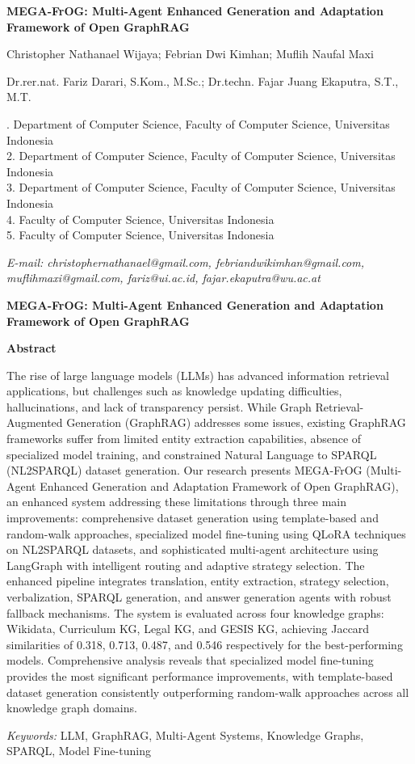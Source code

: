 \documentclass[12pt,a4paper,onecolumn]{article}
\makeatletter
\def\judul{MEGA-FrOG: Multi-Agent Enhanced Generation and Adaptation Framework of Open GraphRAG}
\def\judulInggris{MEGA-FrOG: Multi-Agent Enhanced Generation and Adaptation Framework of Open GraphRAG}
\def\penulisMahasiswa{Christopher Nathanael Wijaya; Febrian Dwi Kimhan; Muflih Naufal Maxi}
\def\penulisPembimbing{Dr.rer.nat. Fariz Darari, S.Kom., M.Sc.; Dr.techn. Fajar Juang Ekaputra, S.T., M.T.}
\def\afiliasiSatu{Department of Computer Science, Faculty of Computer Science, Universitas Indonesia}
\def\afiliasiDua{Department of Computer Science, Faculty of Computer Science, Universitas Indonesia}
\def\afiliasiTiga{Department of Computer Science, Faculty of Computer Science, Universitas Indonesia}
\def\afiliasiEmpat{Faculty of Computer Science, Universitas Indonesia}
\def\afiliasiLima{Faculty of Computer Science, Universitas Indonesia}
\def\emailSatu{christophernathanael@gmail.com, febriandwikimhan@gmail.com, muflihmaxi@gmail.com, fariz@ui.ac.id, fajar.ekaputra@wu.ac.at}
\renewcommand\maketitle{%
  \begin{center}
    {\fontsize{14}{17}\selectfont\bfseries \judul\par\vspace{12pt}}
    {\normalsize \penulisMahasiswa\par}
    {\normalsize \penulisPembimbing\par\vspace{12pt}}
    {\fontsize{10}{12}\selectfont
      1. \afiliasiSatu\\
      2. \afiliasiDua\\
      3. \afiliasiTiga\\
      4. \afiliasiEmpat\\
      5. \afiliasiLima\par}
    \vspace{12pt}
    {\fontsize{10}{12}\selectfont\itshape E-mail: \emailSatu\par}
  \end{center}
}
\makeatother
\begin{document}
\maketitle

\vspace*{2\baselineskip}
{\begin{center}\textbf{\fontsize{12}{14}\selectfont \judulInggris}\end{center}}
\vspace{12pt}
{\begin{center}\textbf{\fontsize{12}{14}\selectfont Abstract}\end{center}}
\vspace{12pt}
{\fontsize{10}{12}\selectfont\singlespacing
The rise of large language models (LLMs) has advanced information retrieval applications, but challenges such as knowledge updating difficulties, hallucinations, and lack of transparency persist. While Graph Retrieval-Augmented Generation (GraphRAG) addresses some issues, existing GraphRAG frameworks suffer from limited entity extraction capabilities, absence of specialized model training, and constrained Natural Language to SPARQL (NL2SPARQL) dataset generation. Our research presents MEGA-FrOG (Multi-Agent Enhanced Generation and Adaptation Framework of Open GraphRAG), an enhanced system addressing these limitations through three main improvements: comprehensive dataset generation using template-based and random-walk approaches, specialized model fine-tuning using QLoRA techniques on NL2SPARQL datasets, and sophisticated multi-agent architecture using LangGraph with intelligent routing and adaptive strategy selection. The enhanced pipeline integrates translation, entity extraction, strategy selection, verbalization, SPARQL generation, and answer generation agents with robust fallback mechanisms. The system is evaluated across four knowledge graphs: Wikidata, Curriculum KG, Legal KG, and GESIS KG, achieving Jaccard similarities of 0.318, 0.713, 0.487, and 0.546 respectively for the best-performing models. Comprehensive analysis reveals that specialized model fine-tuning provides the most significant performance improvements, with template-based dataset generation consistently outperforming random-walk approaches across all knowledge graph domains.\par}

{\fontsize{10}{12}\selectfont\singlespacing\textit{Keywords:} LLM, GraphRAG, Multi-Agent Systems, Knowledge Graphs, SPARQL, Model Fine-tuning \par}
\end{document}
